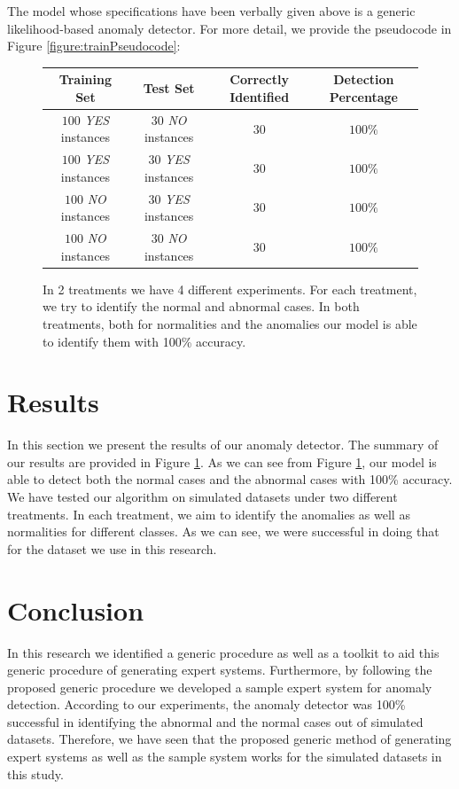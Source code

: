 \documentclass[conference]{IEEEtran}
\begin{document}
The model whose specifications have been verbally given above is a generic likelihood-based anomaly detector.
For more detail, we provide the pseudocode in Figure \ref{figure:trainPseudocode}:


\begin{figure}[th!]
\centering
{\scriptsize 
\begin{tabular}{c|c|c|c} 
 \textbf{Training Set} & \textbf{Test Set} & \textbf{Correctly Identified} & \textbf{Detection Percentage}\\ \hline
$100$ \textit{YES} instances & $30$ \textit{NO} instances & $30$ & $100\%$\\
$100$ \textit{YES} instances & $30$ \textit{YES} instances & $30$ & $100\%$\\
\hline\hline
$100$ \textit{NO} instances & $30$ \textit{YES} instances & $30$ & $100\%$\\
$100$ \textit{NO} instances & $30$ \textit{NO} instances & $30$ & $100\%$\\

\end{tabular}}
\caption{In 2 treatments we have 4 different experiments. For each treatment, we try to identify the normal and abnormal cases. In both treatments, both for normalities and the anomalies our model is able to identify them with 100\% accuracy.}
\label{fig:results}
\end{figure}

\section{Results}

In this section we present the results of our anomaly detector.
The summary of our results are provided in Figure \ref{fig:results}.
As we can see from Figure \ref{fig:results}, our model is able to detect both the normal cases and the abnormal cases with 100\% accuracy.
We have tested our algorithm on simulated datasets under two different treatments.
In each treatment, we aim to identify the anomalies as well as normalities for different classes.
As we can see, we were successful in doing that for the dataset we use in this research.

\section{Conclusion}

In this research we identified a generic procedure as well as a toolkit to aid this generic procedure of generating expert systems.
Furthermore, by following the proposed generic procedure we developed a sample expert system for anomaly detection.
According to our experiments, the anomaly detector was 100\% successful in identifying the abnormal and the normal cases out of simulated datasets.
Therefore, we have seen that the proposed generic method of generating expert systems as well as the sample system works for the simulated datasets in this study.
\end{document}
